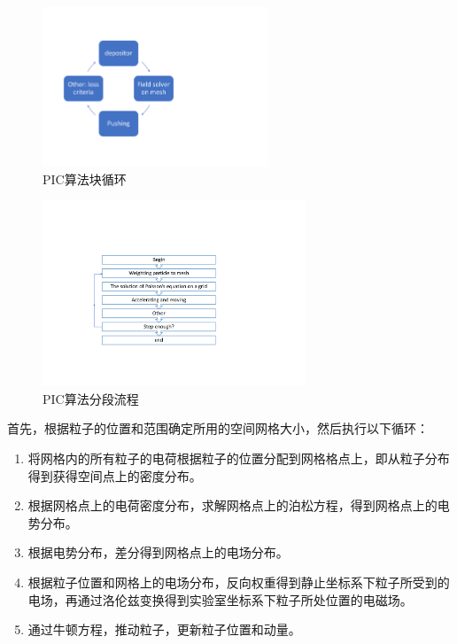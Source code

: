 \begin{figure}[!tbh]
  \centering
    \includegraphics[width=0.6\textwidth]{Img/3_1_PIC.pdf}
    \caption{PIC算法块循环}
    \label{fig:PICflow1}
\end{figure}

\begin{figure}[!tbh]
  \centering
    \includegraphics[width=0.7\textwidth]{Img/3_1_PIC2.pdf}
    \caption{PIC算法分段流程}
    \label{fig:PICflow2}
\end{figure}

首先，根据粒子的位置和范围确定所用的空间网格大小，然后执行以下循环：
\begin{enumerate}
  \item 将网格内的所有粒子的电荷根据粒子的位置分配到网格格点上，即从粒子分布得到获得空间点上的密度分布。
  \item 根据网格点上的电荷密度分布，求解网格点上的泊松方程，得到网格点上的电势分布。
  \item 根据电势分布，差分得到网格点上的电场分布。
  \item 根据粒子位置和网格上的电场分布，反向权重得到静止坐标系下粒子所受到的电场，再通过洛伦兹变换得到实验室坐标系下粒子所处位置的电磁场。
  \item 通过牛顿方程，推动粒子，更新粒子位置和动量。
\end{enumerate}

